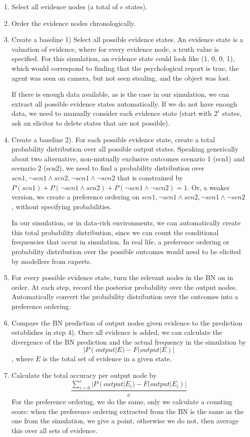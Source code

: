 \documentclass[12pt]{article}
\begin{document}
\begin{enumerate}
\item Select all evidence nodes (a total of $e$ states).
\item Order the evidence nodes chronologically.
\item Create a baseline 1) Select all possible evidence states. An evidence state is a valuation of evidence, where for every evidence node, a truth value is specified. For this simulation, an evidence state could look like (1, 0, 0, 1), which would correspond to finding that the psychological report is true, the agent was seen on camera, but not seen stealing, and the object was lost.

If there is enough data available, as is the case in our simulation, we can extract all possible evidence states automatically. If we do not have enough data, we need to manually consider each evidence state (start with $2^e$ states, ask an elicitor to delete states that are not possible).
\item Create a baseline 2). For each possible evidence state, create a total probability distribution over all possible output states. Speaking generically about two alternative, non-mutually exclusive outcomes scenario 1 (scn1) and scenario 2 (scn2), we need to find a probability distribution over $scn1, \neg scn1 \land scn2, \neg scn1 \land \neg scn2$ that is constrained by $P(scn1) + P(\neg scn1 \land scn2) + P(\neg scn1 \land \neg scn2) = 1$. Or, a weaker version, we create a preference ordering on $scn1, \neg scn1 \land scn2, \neg scn1 \land \neg scn2$, without specifying probabilities. 

In our simulation, or in data-rich environments, we can automatically create this total probability distribution, since we can count the conditional frequencies that occur in simulation. In real life, a preference ordering or probability distribution over the possible outcomes would need to be elicited by modellers from experts.

\item For every possible evidence state, turn the relevant nodes in the BN on in order. At each step, record the posterior probability over the output nodes. Automatically convert the probability distribution over the outcomes into a preference ordering.
\item Compare the BN prediction of output nodes given evidence to the prediction establishes in step 4). Once all evidence is added, we can calculate the divergence of the BN prediction and the actual frequency in the simulation by \[|P(output|E) - F(output|E)|\], where $E$ is the total set of evidence in a given state.
\item Calculate the total accuracy per output node by \[\frac{\sum_{i=0}^{e}|P(output | E_i) - F(output| E_i)|}{e}\] For the preference ordering, we do the same, only we calculate a counting score: when the preference ordering extracted from the BN is the same as the one from the simulation, we give a point, otherwise we do not, then average this over all sets of evidence.
\end{enumerate}
\end{document}
